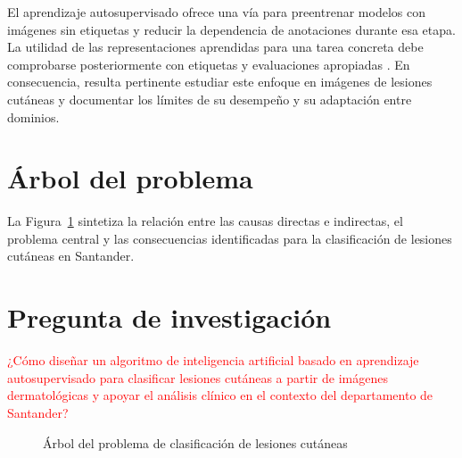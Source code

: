 El aprendizaje autosupervisado ofrece una vía para preentrenar modelos con imágenes sin etiquetas y reducir la dependencia de anotaciones durante esa etapa. La utilidad de las representaciones aprendidas para una tarea concreta debe comprobarse posteriormente con etiquetas y evaluaciones apropiadas \parencite{krishnan2022selfsupervisedmedicine}. En consecuencia, resulta pertinente estudiar este enfoque en imágenes de lesiones cutáneas y documentar los límites de su desempeño y su adaptación entre dominios.

\section{Árbol del problema}

La Figura~\ref{fig:arbol-problema} sintetiza la relación entre las causas directas e indirectas, el problema central y las consecuencias identificadas para la clasificación de lesiones cutáneas en Santander.




\section{Pregunta de investigación}
\textcolor{red}{¿Cómo diseñar un algoritmo de inteligencia artificial basado en aprendizaje autosupervisado para clasificar lesiones cutáneas a partir de imágenes dermatológicas y apoyar el análisis clínico en el contexto del departamento de Santander?}
\begin{figure}[H]
\caption{Árbol del problema de clasificación de lesiones cutáneas}
\label{fig:arbol-problema}
\centering

\par\smallskip
\raggedright\footnotesize
\par{}
\end{figure}

